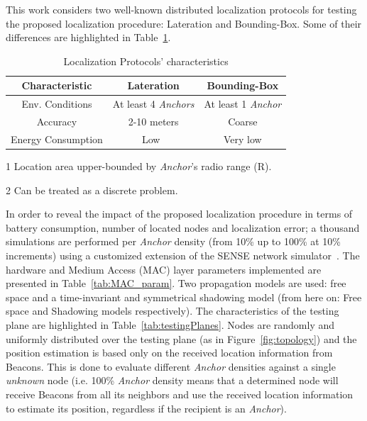 This work considers two well-known distributed localization protocols for testing the proposed localization procedure: Lateration and Bounding-Box. Some of their differences are highlighted in Table~\ref{table:protocols}.

\begin{table}[H]
  \centering
  \begin{threeparttable}[t]
    \caption{Localization Protocols' characteristics}
    \label{table:protocols}
    \begin{tabular}{c||c||c}
    \hline
    \bfseries Characteristic & \bfseries Lateration & \bfseries Bounding-Box\\
    \hline\hline 
    Env. Conditions & At least 4 \emph{Anchors} & At least 1 \emph{Anchor}\\
    Accuracy & 2-10 meters & Coarse\tnote{1}\\
    Energy Consumption & Low~\cite{laterationSpecs} & Very low\tnote{2}\\
    \hline
    \end{tabular}
    \begin{tablenotes}
    \item [1] Location area upper-bounded by \emph{Anchor}'s radio range (R).
    \item [2] Can be treated as a discrete problem.
    \end{tablenotes}
  \end{threeparttable}
\end{table}

In order to reveal the impact of the proposed localization procedure in terms of battery consumption, number of located nodes and localization error; a thousand simulations are performed per \emph{Anchor} density (from 10\% up to 100\% at 10\% increments) using a customized extension of the SENSE network simulator~\cite{sense}. The hardware and Medium Access (MAC) layer parameters implemented are presented in Table~\ref{tab:MAC_param}. Two propagation models are used: free space and a time-invariant and symmetrical shadowing model (from here on: Free space and Shadowing models respectively). The characteristics of the testing plane are highlighted in Table~\ref{tab:testingPlanes}. Nodes are randomly and uniformly distributed over the testing plane (as in Figure~\ref{fig:topology}) and the position estimation is based only on the received location information from Beacons. This is done to evaluate different \emph{Anchor} densities against a single \emph{unknown} node (i.e. 100\% \emph{Anchor} density means 
that a determined node will receive Beacons from all its neighbors and use the received location information to estimate its position, regardless if the recipient is an \emph{Anchor}).

